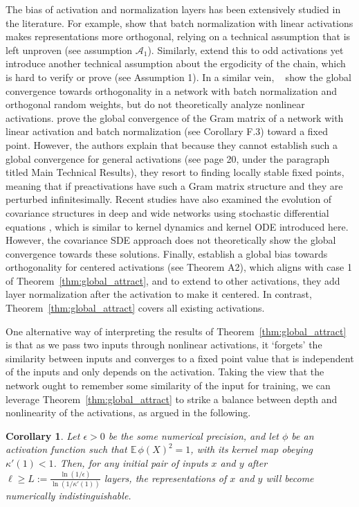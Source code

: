 \documentclass[twoside]{article}
\newcommand{\E}{\mathbb{E}\,}
\newtheorem{corollary}{Corollary}
\theoremstyle{definition}
\begin{document}
The bias of activation and normalization layers has been extensively studied in the literature. For example, \citet{daneshmand2021batch} show that batch normalization with linear activations makes representations more orthogonal, relying on a technical assumption that is left unproven (see assumption $\mathcal{A}_1$). Similarly, \citet{joudaki2023bridging} extend this to odd activations yet introduce another technical assumption about the ergodicity of the chain, which is hard to verify or prove (see Assumption 1). In a similar vein, ~\citet{meterez2024towards} show the global convergence towards orthogonality in a network with batch normalization and orthogonal random weights, but do not theoretically analyze nonlinear activations. \citet{yang2019meanfield} prove the global convergence of the Gram matrix of a network with linear activation and batch normalization (see Corollary F.3) toward a fixed point. However, the authors explain that because they cannot establish such a global convergence for general activations (see page 20, under the paragraph titled Main Technical Results), they resort to finding locally stable fixed points, meaning that if preactivations have such a Gram matrix structure and they are perturbed infinitesimally. Recent studies have also examined the evolution of covariance structures in deep and wide networks using stochastic differential equations \citep{li2022neural}, which is similar to kernel dynamics and kernel ODE introduced here. However, the covariance SDE approach does not theoretically show the global convergence towards these solutions. Finally, \citet{joudaki2023impact} establish a global bias towards orthogonality for centered activations (see Theorem A2), which aligns with case 1 of Theorem~\ref{thm:global_attract}, and to extend to other activations, they add layer normalization after the activation to make it centered. In contrast, Theorem~\ref{thm:global_attract} covers all existing activations. 

One alternative way of interpreting the results of Theorem~\ref{thm:global_attract} is that as we pass two inputs through nonlinear activations, it `forgets' the similarity between inputs and converges to a fixed point value that is independent of the inputs and only depends on the activation. Taking the view that the network ought to remember some similarity of the input for training, we can leverage Theorem~\ref{thm:global_attract} to strike a balance between depth and nonlinearity of the activations, as argued in the following.

\begin{corollary}
\label{cor:convergence_precision}
Let $\epsilon > 0$ be the some numerical precision, and let $\phi$ be an activation function such that $\E\phi(X)^2=1$, with its kernel map obeying $\kappa'(1) < 1$. Then, for any initial pair of inputs $x$ and $y$ after $\ell \ge L:= \frac{\ln(1/\epsilon)}{\ln(1/\kappa'(1))}$ layers, the representations of $x$ and $y$ will become numerically indistinguishable.
\end{corollary}
\end{document}
